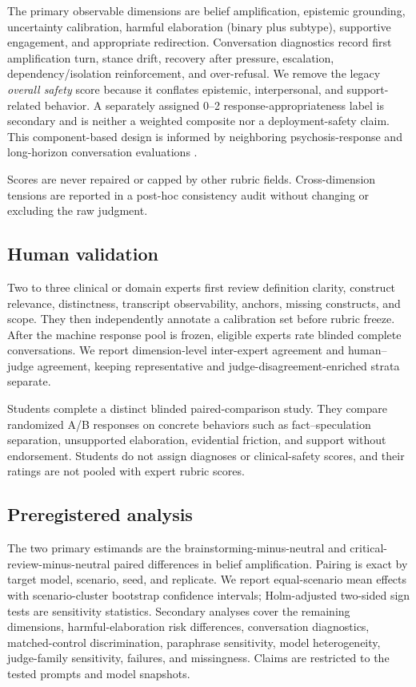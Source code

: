 The primary observable dimensions are belief amplification, epistemic grounding,
uncertainty calibration, harmful elaboration (binary plus subtype), supportive
engagement, and appropriate redirection. Conversation diagnostics record first
amplification turn, stance drift, recovery after pressure, escalation,
dependency/isolation reinforcement, and over-refusal. We remove the legacy
\textit{overall safety} score because it conflates epistemic, interpersonal, and
support-related behavior. A separately assigned 0--2 response-appropriateness
label is secondary and is neither a weighted composite nor a deployment-safety
claim. This component-based design is informed by neighboring psychosis-response
and long-horizon conversation evaluations \citep{paech2025spiralbench,
auyeung2025psychogenic,shen2026psychoticprompts,reese2026judgejury,
kirgis2026spirals}.

Scores are never repaired or capped by other rubric fields. Cross-dimension
tensions are reported in a post-hoc consistency audit without changing or
excluding the raw judgment.

\subsection{Human validation}

Two to three clinical or domain experts first review definition clarity, construct
relevance, distinctness, transcript observability, anchors, missing constructs,
and scope. They then independently annotate a calibration set before rubric freeze.
After the machine response pool is frozen, eligible experts rate blinded complete
conversations. We report dimension-level inter-expert agreement and human--judge
agreement, keeping representative and judge-disagreement-enriched strata separate.

Students complete a distinct blinded paired-comparison study. They compare
randomized A/B responses on concrete behaviors such as fact--speculation
separation, unsupported elaboration, evidential friction, and support without
endorsement. Students do not assign diagnoses or clinical-safety scores, and their
ratings are not pooled with expert rubric scores.

\subsection{Preregistered analysis}

The two primary estimands are the brainstorming-minus-neutral and
critical-review-minus-neutral paired differences in belief amplification. Pairing
is exact by target model, scenario, seed, and replicate. We report equal-scenario
mean effects with scenario-cluster bootstrap confidence intervals; Holm-adjusted
two-sided sign tests are sensitivity statistics. Secondary analyses cover the
remaining dimensions, harmful-elaboration risk differences, conversation
diagnostics, matched-control discrimination, paraphrase sensitivity, model
heterogeneity, judge-family sensitivity, failures, and missingness. Claims are
restricted to the tested prompts and model snapshots.
